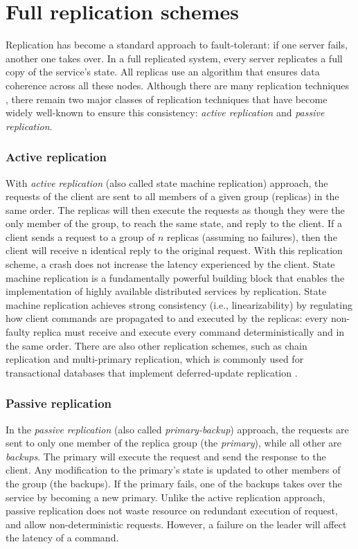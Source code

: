 \section{Full replication schemes}

Replication has become a standard approach to fault-tolerant: if one server
fails, another one takes over. In a full replicated system, every server
replicates a full copy of the service's state. All replicas use an algorithm
that ensures data coherence across all these nodes. Although there are many
replication techniques \cite{Replication:book}, there remain two major classes
of replication techniques that have become widely well-known to ensure this
consistency: \emph{active replication} and \emph{passive replication}.


\subsubsection{Active replication} 
With \emph{active replication} (also called state machine replication) approach,
the requests of the client are sent to all members of a given group (replicas)
in the same order. The replicas will then execute the requests as though they
were the only member of the group, to reach the same state, and reply to the
client. If a client sends a request to a group of $n$ replicas (assuming no
failures), then the client will receive n identical reply to the original
request. With this replication scheme, a crash does not increase the latency
experienced by the client. State machine replication is a fundamentally powerful
building block that enables the implementation of highly available distributed
services by replication. State machine replication achieves strong consistency
(i.e., linearizability) by regulating how client commands are propagated to and
executed by the replicas: every non-faulty replica must receive and execute
every command deterministically and in the same order. There are also other
replication schemes, such as chain replication \cite {chainreplication,
chainreplication:byzantine} and multi-primary replication, which is commonly
used for transactional databases that implement deferred-update replication
\cite{sciascia2012sdur, Replication:book, chundi96dur}.

\subsubsection{Passive replication} 
In the \emph{passive replication} (also called \emph{primary-backup}) approach,
the requests are sent to only one member of the replica group (the
\emph{primary}), while all other are \emph{backups}. The primary will execute
the request and send the response to the client. Any modification to the
primary's state is updated to other members of the group (the backups). If the
primary fails, one of the backups takes over the service by becoming a new
primary. Unlike the active replication approach, passive replication does not
waste resource on redundant execution of request, and allow non-deterministic
requests. However, a failure on the leader will affect the latency of a command.

